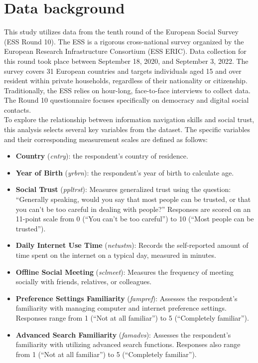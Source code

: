 \documentclass[12pt,letterpaper]{article}
\begin{document}
	\section*{Data background}
	This study utilizes data from the tenth round of the European Social Survey (ESS Round 10). The ESS is a rigorous cross-national survey organized by the European Research Infrastructure Consortium (ESS ERIC). Data collection for this round took place between September 18, 2020, and September 3, 2022. The survey covers 31 European countries and targets individuals aged 15 and over resident within private households, regardless of their nationality or citizenship. Traditionally, the ESS relies on hour-long, face-to-face interviews to collect data. The Round 10 questionnaire focuses specifically on democracy and digital social contacts.\\
	
	To explore the relationship between information navigation skills and social trust, this analysis selects several key variables from the dataset. The specific variables and their corresponding measurement scales are defined as follows:\\
	
	\begin{itemize}
		\item \textbf{Country} (\textit{cntry}): the respondent's country of residence.
		
		\item \textbf{Year of Birth} (\textit{yrbrn}): the respondent's year of birth to calculate age.
		
		\item \textbf{Social Trust} (\textit{ppltrst}): Measures generalized trust using the question: ``Generally speaking, would you say that most people can be trusted, or that you can't be too careful in dealing with people?'' Responses are scored on an 11-point scale from 0 (``You can't be too careful'') to 10 (``Most people can be trusted'').
		
		\item \textbf{Daily Internet Use Time} (\textit{netustm}): Records the self-reported amount of time spent on the internet on a typical day, measured in minutes.
		
		\item \textbf{Offline Social Meeting} (\textit{sclmeet}): Measures the frequency of meeting socially with friends, relatives, or colleagues.
		
		\item \textbf{Preference Settings Familiarity} (\textit{fampref}): Assesses the respondent's familiarity with managing computer and internet preference settings. Responses range from 1 (``Not at all familiar'') to 5 (``Completely familiar'').
		
		\item \textbf{Advanced Search Familiarity} (\textit{famadvs}): Assesses the respondent's familiarity with utilizing advanced search functions. Responses also range from 1 (``Not at all familiar'') to 5 (``Completely familiar'').
	\end{itemize}
	
\end{document}
